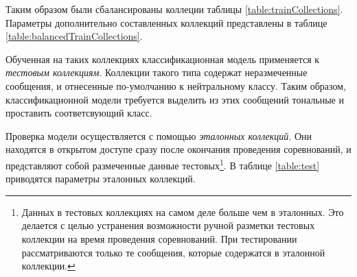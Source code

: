    Таким образом были сбалансированы коллеции таблицы \ref{table:trainCollections}.
    Параметры дополнительно составленных коллекций представлены
    в таблице \ref{table:balancedTrainCollections}.

    

    Обученная на таких коллекциях классификационная модель применяется к
    {\it тестовым коллекциям}.
    Коллекции такого типа содержат неразмеченные сообщения, и отнесенные по-умолчанию
    к нейтральному классу.
    Таким образом, классификационной модели требуется выделить из этих сообщений
    тональные и проставить соответсвующий класс.

    Проверка модели осуществляется с помощью {\it эталонных коллекций}.
    Они находятся в открытом доступе сразу после окончания проведения соревнований,
    и представляют собой размеченные данные тестовых\footnote{
        Данных в тестовых коллекциях на самом деле больше чем в эталонных.
        Это делается с целью устранения возможности ручной разметки
        тестовых коллекции на время проведения соревнований.
        При тестировании рассматриваются только те сообщения, которые содержатся
        в эталонной коллекции.
    }.
    В таблице \ref{table:test} приводятся параметры эталонных коллекций.

    

